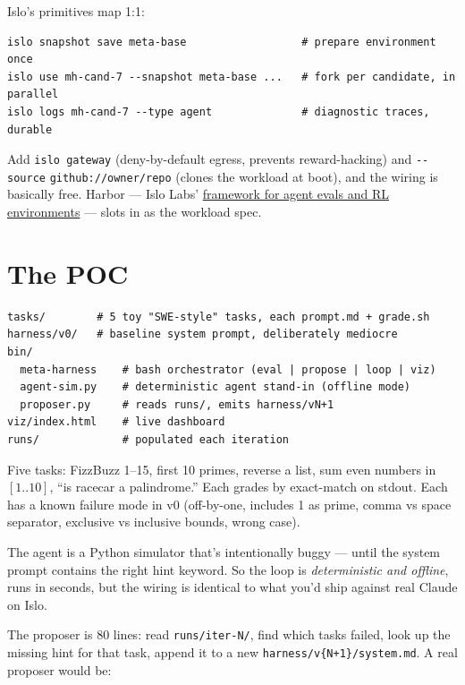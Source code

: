 \documentclass[11pt]{article}
\begin{document}
\noindent Islo's primitives map 1:1:

\begin{lstlisting}[language=shell]
islo snapshot save meta-base                  # prepare environment once
islo use mh-cand-7 --snapshot meta-base ...   # fork per candidate, in parallel
islo logs mh-cand-7 --type agent              # diagnostic traces, durable
\end{lstlisting}

Add \texttt{islo gateway} (deny-by-default egress, prevents reward-hacking)
and \texttt{-{}-source} \texttt{github://\allowbreak{}owner/\allowbreak{}repo}
(clones the workload at boot), and the wiring is basically free. Harbor ---
Islo Labs' \href{https://github.com/islo-labs/harbor}{framework for agent
evals and RL environments} --- slots in as the workload spec.

\section*{The POC}

\begin{lstlisting}[language=shell]
tasks/        # 5 toy "SWE-style" tasks, each prompt.md + grade.sh
harness/v0/   # baseline system prompt, deliberately mediocre
bin/
  meta-harness    # bash orchestrator (eval | propose | loop | viz)
  agent-sim.py    # deterministic agent stand-in (offline mode)
  proposer.py     # reads runs/, emits harness/vN+1
viz/index.html    # live dashboard
runs/             # populated each iteration
\end{lstlisting}

\noindent Five tasks: FizzBuzz 1--15, first 10 primes, reverse a list, sum
even numbers in $[1..10]$, ``is racecar a palindrome.'' Each grades by
exact-match on stdout. Each has a known failure mode in v0 (off-by-one,
includes 1 as prime, comma vs space separator, exclusive vs inclusive bounds,
wrong case).

The agent is a Python simulator that's intentionally buggy --- until the
system prompt contains the right hint keyword. So the loop is
\emph{deterministic and offline}, runs in seconds, but the wiring is
identical to what you'd ship against real Claude on Islo.

The proposer is 80 lines: read \texttt{runs/iter-N/}, find which tasks
failed, look up the missing hint for that task, append it to a new
\texttt{harness/v\{N+1\}/system.md}. A real proposer would be:
\end{document}
